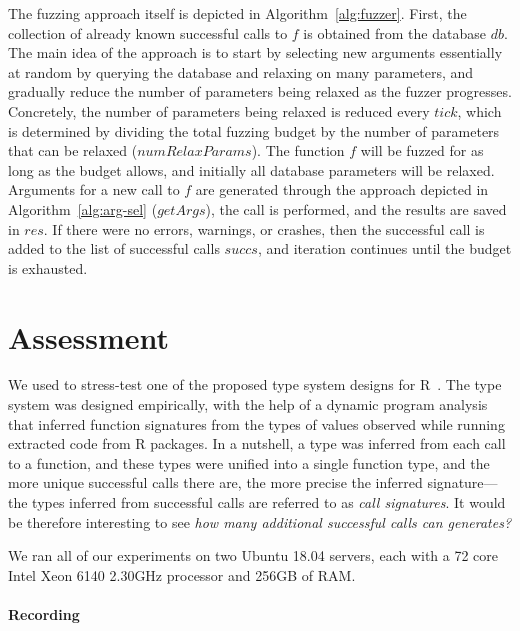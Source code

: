 \documentclass[sigplan,nonacm,anonymous,review]{acmart}
\begin{document}
The fuzzing approach itself is depicted in Algorithm~\ref{alg:fuzzer}.
First, the collection of already known successful calls to $f$ is
obtained from the database $db$.  The main idea of the approach is to
start by selecting new arguments essentially at random by querying the
database and relaxing on many parameters, and gradually reduce the
number of parameters being relaxed as the fuzzer progresses.
Concretely, the number of parameters being relaxed is reduced every
$tick$, which is determined by dividing the total fuzzing budget by
the number of parameters that can be relaxed ($numRelaxParams$).
The function $f$ will be fuzzed for as long as the budget allows, and
initially all database parameters will be relaxed.  Arguments for a
new call to $f$ are generated through the approach depicted in
Algorithm~\ref{alg:arg-sel} ($getArgs$), the call is performed, and
the results are saved in $res$.  If there were no errors, warnings, or
crashes, then the successful call is added to the list of successful
calls $succs$, and iteration continues until the budget is exhausted.



\section{Assessment}
\label{sec:assessment}

We used \tool to stress-test one of the proposed type system designs for R~\cite{turcotte2020designing}.
The type system was designed empirically, with the help of a dynamic program analysis that inferred function signatures from the types of values observed while running extracted code from R packages.
In a nutshell, a type was inferred from each call to a function, and these types were unified into a single function type, and the more unique successful calls there are, the more precise the inferred signature---the types inferred from successful calls are referred to as \textit{call signatures}.
It would be therefore interesting to see \emph{how many additional successful calls can \tool generates?}

We ran all of our experiments on two Ubuntu 18.04 servers, each with a 72 core Intel Xeon 6140 2.30GHz processor and 256GB of RAM.

\paragraph{Recording}
\end{document}
